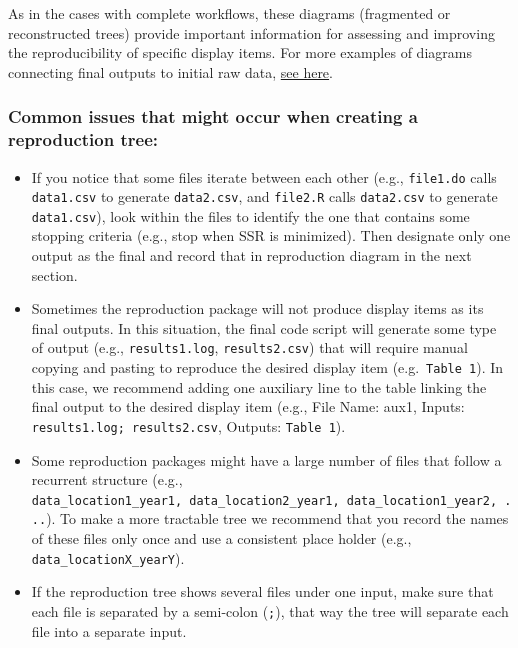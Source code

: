 \documentclass[
]{book}
\begin{document}
As in the cases with complete workflows, these diagrams (fragmented or reconstructed trees) provide important information for assessing and improving the reproducibility of specific display items. For more examples of diagrams connecting final outputs to initial raw data, \protect\hyperlink{examples-of-reproduction-trees}{see here}.

\hypertarget{common-issues-that-might-occur-when-creating-a-reproduction-tree}{%
\subsubsection{Common issues that might occur when creating a reproduction tree:}\label{common-issues-that-might-occur-when-creating-a-reproduction-tree}}

\begin{itemize}
\item
  If you notice that some files iterate between each other (e.g., \texttt{file1.do} calls \texttt{data1.csv} to generate \texttt{data2.csv}, and \texttt{file2.R} calls \texttt{data2.csv} to generate \texttt{data1.csv}), look within the files to identify the one that contains some stopping criteria (e.g., stop when SSR is minimized). Then designate only one output as the final and record that in reproduction diagram in the next section.
\item
  Sometimes the reproduction package will not produce display items as its final outputs. In this situation, the final code script will generate some type of output (e.g., \texttt{results1.log}, \texttt{results2.csv}) that will require manual copying and pasting to reproduce the desired display item (e.g.~\texttt{Table\ 1}). In this case, we recommend adding one auxiliary line to the table linking the final output to the desired display item (e.g., File Name: aux1, Inputs: \texttt{results1.log;\ results2.csv}, Outputs: \texttt{Table\ 1}).
\item
  Some reproduction packages might have a large number of files that follow a recurrent structure (e.g., \texttt{data\_location1\_year1,\ data\_location2\_year1,\ data\_location1\_year2,\ ...}). To make a more tractable tree we recommend that you record the names of these files only once and use a consistent place holder (e.g., \texttt{data\_locationX\_yearY}).
\item
  If the reproduction tree shows several files under one input, make sure that each file is separated by a semi-colon (\texttt{;}), that way the tree will separate each file into a separate input.
\end{itemize}
\end{document}

